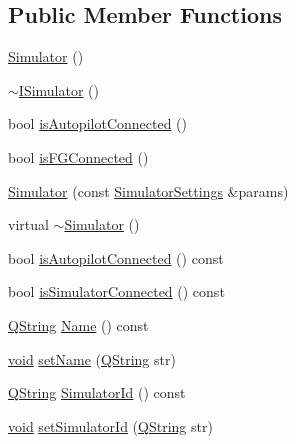 \subsection*{\-Public \-Member \-Functions}
\begin{DoxyCompactItemize}
\item 
\hyperlink{class_simulator_a031573bfcfe2e0f5c9539bcc1c7fc5d9}{\-Simulator} ()
\item 
\hyperlink{class_simulator_a2961f34fd868d8f8f3eb71ab002df54f}{$\sim$\-I\-Simulator} ()
\item 
bool \hyperlink{class_simulator_a9a69b3d8f2f2e54d7e59f31afdccc9f1}{is\-Autopilot\-Connected} ()
\item 
bool \hyperlink{class_simulator_a11578ec4371c6833eee4e28684e874b5}{is\-F\-G\-Connected} ()
\item 
\hyperlink{group___h_i_t_l_plugin_ga8599e13b1f45081a08b7dd1f8c2a988b}{\-Simulator} (const \hyperlink{group___h_i_t_l_plugin_ga052199f1328d3002bce3e45345aa7f4e}{\-Simulator\-Settings} \&params)
\item 
virtual \hyperlink{group___h_i_t_l_plugin_ga0f49aa04f42060a785adf77346b9de9f}{$\sim$\-Simulator} ()
\item 
bool \hyperlink{group___h_i_t_l_plugin_gae38ae2b9870e2eb3888b406ef069b0ac}{is\-Autopilot\-Connected} () const 
\item 
bool \hyperlink{group___h_i_t_l_plugin_ga4736ea66352f66d9977879364f3c3c0a}{is\-Simulator\-Connected} () const 
\item 
\hyperlink{group___u_a_v_objects_plugin_gab9d252f49c333c94a72f97ce3105a32d}{\-Q\-String} \hyperlink{group___h_i_t_l_plugin_ga40c6b40efb10e456ccedfdcd88d5988d}{\-Name} () const 
\item 
\hyperlink{group___u_a_v_objects_plugin_ga444cf2ff3f0ecbe028adce838d373f5c}{void} \hyperlink{group___h_i_t_l_plugin_ga11bc3ca9ef98431bcb82d8b72ad127b8}{set\-Name} (\hyperlink{group___u_a_v_objects_plugin_gab9d252f49c333c94a72f97ce3105a32d}{\-Q\-String} str)
\item 
\hyperlink{group___u_a_v_objects_plugin_gab9d252f49c333c94a72f97ce3105a32d}{\-Q\-String} \hyperlink{group___h_i_t_l_plugin_gac518ebc236c9f36b629c1145408315aa}{\-Simulator\-Id} () const 
\item 
\hyperlink{group___u_a_v_objects_plugin_ga444cf2ff3f0ecbe028adce838d373f5c}{void} \hyperlink{group___h_i_t_l_plugin_ga7c1b69b9900d1cb7e5b849f98adf0f9c}{set\-Simulator\-Id} (\hyperlink{group___u_a_v_objects_plugin_gab9d252f49c333c94a72f97ce3105a32d}{\-Q\-String} str)
\item 

\end{DoxyCompactItemize}
